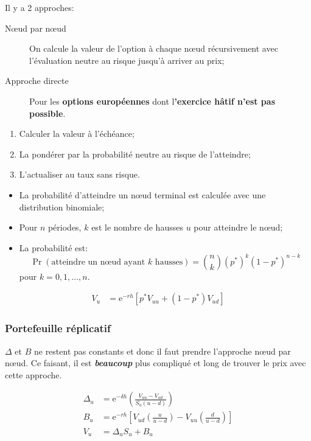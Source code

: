 \documentclass[10pt, french]{article}
\begin{document}
\begin{multicols*}{2}
Il y a 2 approches:
\begin{description}
	\item[Nœud par nœud]	On calcule la valeur de l'option à chaque nœud récursivement avec l'évaluation neutre au risque jusqu'à arriver au prix;
	\item[Approche directe]	Pour les \textbf{options européennes} dont l\textbf{'exercice hâtif n'est pas possible}.
\end{description}

\begin{algo2}
\begin{enumerate}[leftmargin = *]
	\item	Calculer la valeur à l'échéance;
	\item	La pondérer par la probabilité neutre au risque de l'atteindre;
	\item	L'actualiser au taux sans risque.
\end{enumerate}
\tcbline
\begin{itemize}[leftmargin = *]
	\item	La probabilité d'atteindre un nœud terminal est calculée avec une distribution binomiale;
	\item	Pour $n$ périodes, $k$ est le nombre de hausses $u$ pour atteindre le nœud;
	\item	La probabilité est: \[\Pr(\text{atteindre un nœud ayant $k$ hausses})	=	\binom{n}{k} (p^{*})^{k} (1 - p^{*})^{n - k}\] pour $k = 0, 1, \dots, n$.
\end{itemize}
\end{algo2}

\begin{distributions}
\begin{align*}
	V_{u}	&=	\textrm{e}^{-r h}\left[ p^{*}V_{uu} + (1 - p^{*})V_{ud} \right]
\end{align*}
\end{distributions}

\subsubsection*{Portefeuille réplicatif}

$\Delta$ et $B$ ne restent pas constants et donc il faut prendre l'approche nœud par nœud. Ce faisant, il est \textit{\textbf{beaucoup}} plus compliqué et long de trouver le prix avec cette approche.

\begin{distributions}
\begin{align*}
	\Delta_{u}	&=	\textrm{e}^{-\delta h}\left( \frac{V_{uu} - V_{ud}}{S_{u}(u - d)} \right)	\\
	B_{u}	&=	\textrm{e}^{-r h} \left[ V_{ud}\left(	\frac{u}{u - d}\right) - V_{uu} \left(\frac{d}{u - d}\right) \right]	\\
	V_{u}	&=	\Delta_{u} S_{u} + B_{u}
\end{align*}
\end{distributions}


\end{multicols*}
\end{document}
